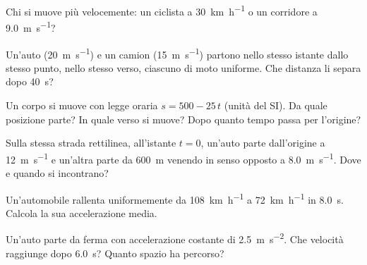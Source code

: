 \begin{esercizio}
Chi si muove più velocemente: un ciclista a \SI{30}{\kilo\metre\per\hour} o un corridore a \SI{9,0}{\metre\per\second}?\\
\end{esercizio}

\begin{esercizio}
Un'auto (\SI{20}{\metre\per\second}) e un camion (\SI{15}{\metre\per\second}) partono nello stesso istante dallo stesso punto, nello stesso verso, ciascuno di moto uniforme. Che distanza li separa dopo \SI{40}{\second}?\\
\end{esercizio}

\begin{esercizio}
Un corpo si muove con legge oraria $s = 500 - 25\,t$ (unità del SI). Da quale posizione parte? In quale verso si muove? Dopo quanto tempo passa per l'origine?\\
\end{esercizio}

\begin{esercizio}
Sulla stessa strada rettilinea, all'istante $t = 0$, un'auto parte dall'origine a \SI{12}{\metre\per\second} e un'altra parte da \SI{600}{\metre} venendo in senso opposto a \SI{8,0}{\metre\per\second}. Dove e quando si incontrano?\\
\end{esercizio}

\begin{esercizio}
Un'automobile rallenta uniformemente da \SI{108}{\kilo\metre\per\hour} a \SI{72}{\kilo\metre\per\hour} in \SI{8,0}{\second}. Calcola la sua accelerazione media.\\
\end{esercizio}

\begin{esercizio}
Un'auto parte da ferma con accelerazione costante di \SI{2,5}{\metre\per\second\squared}. Che velocità raggiunge dopo \SI{6,0}{\second}? Quanto spazio ha percorso?\\
\end{esercizio}

